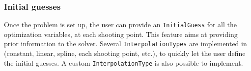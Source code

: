\subsubsection{Initial guesses}
Once the problem is set up, the user can provide an \texttt{InitialGuess} for all the optimization variables, at each shooting point.
This feature aims at providing prior information to the solver.
Several \texttt{InterpolationTypes} are implemented in \bioptim (constant, linear, spline, each shooting point, etc.), to quickly let the user define the initial guesses.
A custom \texttt{InterpolationType} is also possible to implement.
